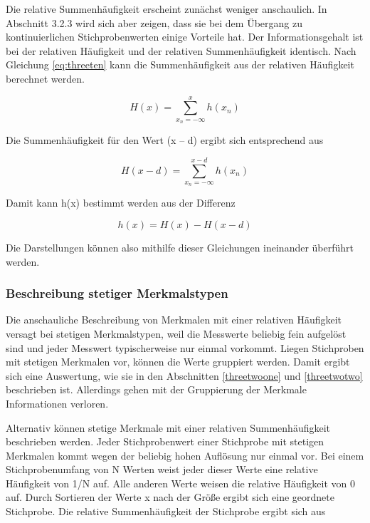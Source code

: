 \noindent Die relative Summenh\"{a}ufigkeit erscheint zun\"{a}chst weniger anschaulich. In Abschnitt 3.2.3 wird sich aber zeigen, dass sie bei dem \"{U}bergang zu kontinuierlichen Stichprobenwerten einige Vorteile hat. Der Informationsgehalt ist bei der relativen H\"{a}ufigkeit und der relativen Summenh\"{a}ufigkeit identisch. Nach Gleichung \eqref{eq:threeten} kann die Summenh\"{a}ufigkeit aus der relativen H\"{a}ufigkeit berechnet werden.

\begin{equation}\label{eq:threeeleven}
H(x)=\sum _{x_{n} =-\infty }^{x}h(x_{n})
\end{equation}

\noindent Die Summenh\"{a}ufigkeit f\"{u}r den Wert (x -- d) ergibt sich entsprechend aus

\begin{equation}\label{eq:threetwelve}
H(x-d)=\sum _{x_{n} =-\infty }^{x-d}h(x_{n})
\end{equation}

\noindent Damit kann h(x) bestimmt werden aus der Differenz

\begin{equation}\label{eq:threethirteen}
h(x)=H(x)-H(x-d)
\end{equation}

\noindent Die Darstellungen k\"{o}nnen also mithilfe dieser Gleichungen ineinander \"{u}berf\"{u}hrt werden.

\subsubsection{Beschreibung stetiger Merkmalstypen}

\noindent Die anschauliche Beschreibung von Merkmalen mit einer relativen H\"{a}ufigkeit versagt bei stetigen Merkmalstypen, weil die Messwerte beliebig fein aufgel\"{o}st sind und jeder Messwert typischerweise nur einmal vorkommt. Liegen Stichproben mit stetigen Merkmalen vor, k\"{o}nnen die Werte gruppiert werden. Damit ergibt sich eine Auswertung, wie sie in den Abschnitten \ref{threetwoone} und \ref{threetwotwo} beschrieben ist. Allerdings gehen mit der Gruppierung der Merkmale Informationen verloren.\newline

\noindent Alternativ k\"{o}nnen stetige Merkmale mit einer relativen Summenh\"{a}ufigkeit beschrieben werden. Jeder Stichprobenwert einer Stichprobe mit stetigen Merkmalen kommt wegen der beliebig hohen Aufl\"{o}sung nur einmal vor. Bei einem Stichprobenumfang von N Werten weist jeder dieser Werte eine relative H\"{a}ufigkeit von 1/N auf. Alle anderen Werte weisen die relative H\"{a}ufigkeit von 0 auf. Durch Sortieren der Werte x nach der Gr\"{o}{\ss}e ergibt sich eine geordnete Stichprobe. Die relative Summenh\"{a}ufigkeit der Stichprobe ergibt sich aus 

